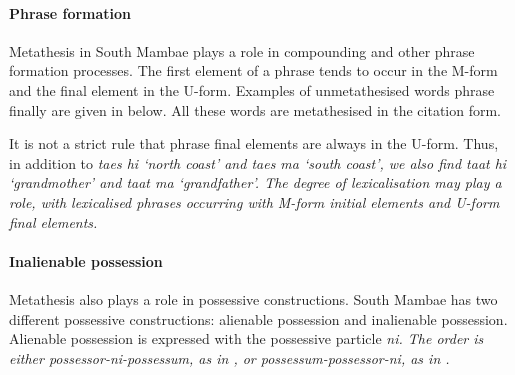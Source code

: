 \paragraph{Phrase formation}\label{sec:PhrFor}
Metathesis in South Mambae plays a role in compounding
and other phrase formation processes.
The first element of a phrase tends
to occur in the M-form and the final element in the U-form.
Examples of unmetathesised words phrase finally
are given in  below.
All these words are metathesised in the citation form.

\begin{exe}
	\label{ex:MamPhrFor}
\end{exe}

It is not a strict rule that phrase final elements are always in the U-form.
Thus, in addition to \it{taes hi} `north coast'
and \it{taes ma} `south coast',
we also find \it{taat hi} `grandmother' and \it{taat ma} `grandfather'.
The degree of lexicalisation may play a role,
with lexicalised phrases occurring with M-form initial elements
and U-form final elements.

\paragraph{Inalienable possession}\label{sec:InaPos}
Metathesis also plays a role in possessive constructions.
South Mambae has two different possessive constructions:
alienable possession and inalienable possession.
Alienable possession is expressed with the possessive particle \it{ni}.
The order is either possessor-\it{ni}-possessum,
as in , or possessum-possessor-\it{ni},
as in .


